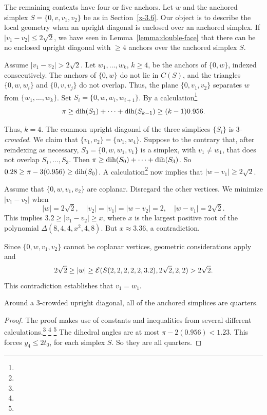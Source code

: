 The remaining contexts have four or  five anchors. Let $w$ and the
anchored simplex $S=\{0,v,v_1,v_2\}$ be as in Section~\ref{x-3.6}.
Our object is to describe the local geometry when an upright
diagonal is enclosed over an anchored simplex. If $|v_1-v_2|\le
2\sqrt{2}$, we have seen in Lemma~\ref{lemma:double-face} that
there can be no enclosed upright diagonal with $\ge 4$ anchors
over the anchored simplex $S$.

Assume  $|v_1-v_2|>2\sqrt{2}$. Let $w_1,\ldots,w_k$, $k\ge4$, be the
anchors of $\{0,w\}$, indexed consecutively. The anchors of $\{0,w\}$ do not
lie in $C(S)$, and the triangles $\{0,w,w_i\}$ and $\{0,v,v_j\}$ do not
overlap. Thus, the plane $\{0,v_1,v_2\}$ separates $w$ from
$\{w_1,\ldots,w_k\}$. Set $S_i=\{0,w,w_i,w_{i+1}\}$.
By a calculation\footnote{} %
    $$\pi\ge \operatorname{dih}(S_1)+\cdots+\operatorname{dih}(S_{k-1})\ge (k-1)0.956.$$

Thus, $k=4$. The common upright diagonal  of the three simplices
$\{S_i\}$ is {\it $3$-crowded}.  We claim that
$\{v_1,v_2\}=\{w_1,w_4\}$. Suppose to the contrary that, after
reindexing as necessary, $S_0=\{0,w,w_1,v_1\}$ is a simplex, with
$v_1\ne w_1$, that does not overlap $S_1,\ldots,S_3$. Then $\pi\ge
\operatorname{dih}(S_0)+\cdots+\operatorname{dih}(S_3)$. So
    $0.28\ge \pi-3(0.956)\ge \operatorname{dih}(S_0)$.
A calculation\footnote{} %
now implies that $|w-v_1|\ge 2\sqrt{2}$.

Assume that $\{0,w,v_1,v_2\}$ are coplanar.  Disregard the other vertices.
We minimize $|v_1-v_2|$ when
    $$|w|=2\sqrt{2},\quad |v_2|=|v_1|=|w-v_2|=2,\quad |w-v_1|=2\sqrt{2}.$$
This implies
    $3.2\ge|v_1-v_2|\ge x$,
where $x$ is the largest positive root of the polynomial
$\Delta(8,4,4,x^2,4,8)$. But $x\approx 3.36$, a contradiction.

Since $\{0,w,v_1,v_2\}$ cannot be coplanar vertices, geometric
considerations apply and
    $$
    2\sqrt{2}\ge |w| \ge {{\mathcal E}}(S(2,2,2,2,2,3.2),2\sqrt{2},2,2)>2\sqrt{2}.
    $$
This contradiction establishes that $v_1=w_1$.

\begin{lemma}
Around a $3$-crowded upright diagonal, all of the anchored
simplices are quarters.
\end{lemma}

\begin{proof}  The proof makes use of constants and inequalities from
several different calculations.\footnote{} %
\footnote{} %
\footnote{} %
The dihedral angles are at most $\pi-
2(0.956) < 1.23$. This forces $y_4\le 2t_0$, for each simplex $S$.
So they are all quarters.
\end{proof}


